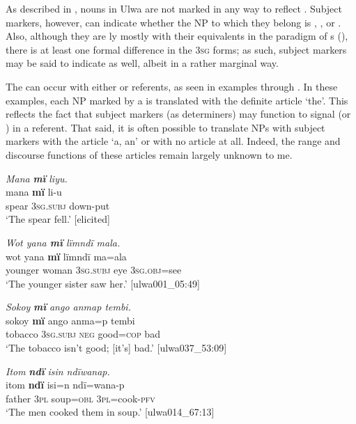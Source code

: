 As described in , nouns in Ulwa are not marked in any way to reflect . Subject markers, however, can indicate whether the NP to which they belong is , , or . Also, although they are ly mostly  with their equivalents in the paradigm of s (), there is at least one formal difference in the 3\textsc{sg} forms; as such, subject markers may be said to indicate  as well, albeit in a rather marginal way.

The  can occur with either  or  referents, as seen in examples  through . In these examples, each NP marked by a  is translated with the  definite article ‘the’. This reflects the fact that subject markers (as determiners) may function to signal  (or ) in a referent. That said, it is often possible to translate NPs with subject markers with the   article ‘a, an’ or with no article at all. Indeed, the  range and discourse functions of these articles remain largely unknown to me.

\ea%
    \label{ex:det:2}
            \textit{Mana} \textbf{\textit{mï}} \textit{liyu.}\\
\gll    mana  \textbf{mï}      li-u\\
    spear  3\textsc{sg.subj}  down-put\\
\glt `The spear fell.’ [elicited]
\z

\ea%
    \label{ex:det:3}
            \textit{Wot yana \textbf{mï} lïmndï mala.}\\
\gll    wot    yana    \textbf{mï}      lïmndï  ma=ala\\
    younger  woman    3\textsc{sg.subj}  eye    \textsc{3sg.obj}=see\\
\glt `The younger sister saw her.’ [ulwa001\_05:49]
\z

\ea%
    \label{ex:det:4}
            \textit{Sokoy} \textbf{\textit{mï}} \textit{ango anmap tembi.}\\
\gll    sokoy    \textbf{mï}      ango  anma=p  tembi\\
    tobacco  3\textsc{sg.subj}  \textsc{neg}  good=\textsc{cop}  bad\\
\glt `The tobacco isn’t good; [it’s] bad.’ [ulwa037\_53:09]
\z

\ea%
    \label{ex:det:5}
            \textit{Itom} \textbf{\textit{ndï}} \textit{isin ndïwanap.}\\
\gll    itom  \textbf{ndï}  isi=n    ndï=wana-p\\
    father  \textsc{3pl}  soup=\textsc{obl}  3\textsc{pl}=cook-\textsc{pfv}\\
\glt `The men cooked them in soup.’ [ulwa014\_67:13]
\z

